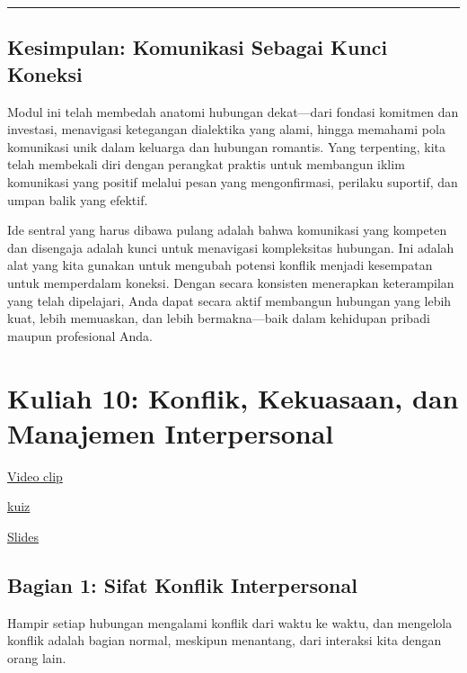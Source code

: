 \documentclass[
  letterpaper,
  DIV=11,
  numbers=noendperiod]{scrreprt}
\begin{document}
\begin{center}\rule{0.5\linewidth}{0.5pt}\end{center}

\section{\texorpdfstring{\textbf{Kesimpulan: Komunikasi Sebagai Kunci
Koneksi}}{Kesimpulan: Komunikasi Sebagai Kunci Koneksi}}\label{kesimpulan-komunikasi-sebagai-kunci-koneksi}

Modul ini telah membedah anatomi hubungan dekat---dari fondasi komitmen
dan investasi, menavigasi ketegangan dialektika yang alami, hingga
memahami pola komunikasi unik dalam keluarga dan hubungan romantis. Yang
terpenting, kita telah membekali diri dengan perangkat praktis untuk
membangun iklim komunikasi yang positif melalui pesan yang
mengonfirmasi, perilaku suportif, dan umpan balik yang efektif.

Ide sentral yang harus dibawa pulang adalah bahwa komunikasi yang
kompeten dan disengaja adalah kunci untuk menavigasi kompleksitas
hubungan. Ini adalah alat yang kita gunakan untuk mengubah potensi
konflik menjadi kesempatan untuk memperdalam koneksi. Dengan secara
konsisten menerapkan keterampilan yang telah dipelajari, Anda dapat
secara aktif membangun hubungan yang lebih kuat, lebih memuaskan, dan
lebih bermakna---baik dalam kehidupan pribadi maupun profesional Anda.


\chapter{Kuliah 10: Konflik, Kekuasaan, dan Manajemen
Interpersonal}\label{kuliah-10-konflik-kekuasaan-dan-manajemen-interpersonal}

\href{https://youtube.com/playlist?list=PL_m-BplfO92HUvXicvfXzsWMXfri1f5Dj&si=ZpC4hnhezyuvzXGo}{Video
clip}

\href{https://forms.office.com/r/Z1Quru8jLa}{kuiz}

\href{./SLIDES_Kuliah_10_Konflik.pdf}{Slides}

\section{Bagian 1: Sifat Konflik
Interpersonal}\label{bagian-1-sifat-konflik-interpersonal}

Hampir setiap hubungan mengalami konflik dari waktu ke waktu, dan
mengelola konflik adalah bagian normal, meskipun menantang, dari
interaksi kita dengan orang lain.
\end{document}
